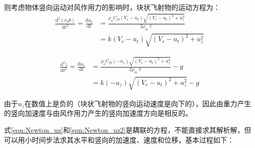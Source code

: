 \documentclass{ctexart}
\begin{document}
则考虑物体竖向运动对风作用力的影响时，块状飞射物的运动方程为\cite{Holmes2004}：
\begin{equation}
\label{eqn:Newton_uz}
\begin{split}
\frac{\mathrm{d}^2 (r_0 \theta)}{\mathrm{d} t^2} = \frac{\mathrm{d} u_t}{\mathrm{d} t}& = \frac{\rho_a C_D (V_r - u_t)\sqrt{\left(V_r-u_t\right)^2+u_z^2}}{2\rho_m \ell} \\
 & = k\left(V_r-u_t\right)\sqrt{\left(V_r-u_t\right)^2+u_z^2}
\end{split}
\end{equation}

\begin{equation}
\label{eqn:Newton_uz2}
\begin{split}
  \frac{\mathrm{d}^2 z}{\mathrm{d} t^2} = \frac{\mathrm{d}u_z}{\mathrm{d} t}&=  \frac{\rho_a C_D ( - u_z)\sqrt{\left(V_r-u_t\right)^2+u_z^2}}{2\rho_m \ell} -g \\
   & = k\left(-u_z\right)\sqrt{\left(V_r-u_t\right)^2+u_z^2}-g
\end{split}
\end{equation}

由于$u_z$在数值上是负的（块状飞射物的竖向运动速度是向下的），因此由重力产生的竖向加速度与由风作用力产生的竖向加速度方向是相反的。

式\eqref{eqn:Newton_uz}和\eqref{eqn:Newton_uz2}是耦联的方程，不能直接求其解析解，但可以用小时间步法\cite{Baker2004}\cite{Zhu2008}求其水平和竖向的加速度、速度和位移，基本过程如下：
\end{document}
